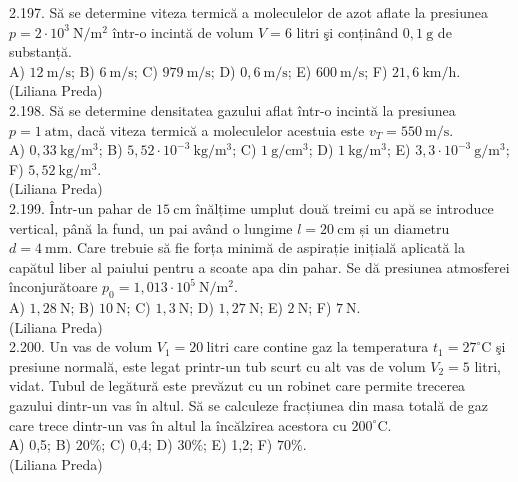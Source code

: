 \documentclass[10pt]{article}
\begin{document}
2.197. Să se determine viteza termică a moleculelor de azot aflate la presiunea $p=2 \cdot 10^{3} \mathrm{~N} / \mathrm{m}^{2}$ într-o incintă de volum $V=6$ litri şi conținând $0,1 \mathrm{~g}$ de substanță.\\ A) $12 \mathrm{~m} / \mathrm{s}$; B) $6 \mathrm{~m} / \mathrm{s}$; C) $979 \mathrm{~m} / \mathrm{s}$; D) $0,6 \mathrm{~m} / \mathrm{s}$; E) $600 \mathrm{~m} / \mathrm{s}$; F) $21,6 \mathrm{~km} / \mathrm{h}$.\\ (Liliana Preda)\\

2.198. Să se determine densitatea gazului aflat într-o incintă la presiunea $p=1 \mathrm{~atm}$, dacă viteza termică a moleculelor acestuia este $v_{T}=550 \mathrm{~m} / \mathrm{s}$.\\ A) $0,33 \mathrm{~kg} / \mathrm{m}^{3}$; B) $5,52 \cdot 10^{-3} \mathrm{~kg} / \mathrm{m}^{3}$; C) $1 \mathrm{~g} / \mathrm{cm}^{3}$; D) $1 \mathrm{~kg} / \mathrm{m}^{3}$; E) $3,3 \cdot 10^{-3} \mathrm{~g} / \mathrm{m}^{3}$; F) $5,52 \mathrm{~kg} / \mathrm{m}^{3}$.\\ (Liliana Preda)\\

2.199. Într-un pahar de $15 \mathrm{~cm}$ înălțime umplut două treimi cu apă se introduce vertical, până la fund, un pai având o lungime $l=20 \mathrm{~cm}$ și un diametru $d=4 \mathrm{~mm}$. Care trebuie să fie forța minimă de aspirație inițială aplicată la capătul liber al paiului pentru a scoate apa din pahar. Se dă presiunea atmosferei înconjurătoare $p_{0}=1,013 \cdot 10^{5} \mathrm{~N} / \mathrm{m}^{2}$.\\ A) $1,28 \mathrm{~N}$; B) $10 \mathrm{~N}$; C) $1,3 \mathrm{~N}$; D) $1,27 \mathrm{~N}$; E) $2 \mathrm{~N}$; F) $7 \mathrm{~N}$.\\ (Liliana Preda)\\

2.200. Un vas de volum $V_{1}=20 \mathrm{~litri}$ care contine gaz la temperatura $t_{1}=27^{\circ} \mathrm{C}$ şi presiune normală, este legat printr-un tub scurt cu alt vas de volum $V_{2}=5$ litri, vidat. Tubul de legătură este prevăzut cu un robinet care permite trecerea gazului dintr-un vas în altul. Să se calculeze fracțiunea din masa totală de gaz care trece dintr-un vas în altul la încălzirea acestora cu $200^{\circ} \mathrm{C}$.\\ А) 0,5; B) $20 \%$; C) 0,4; D) $30 \%$; E) 1,2; F) $70 \%$.\\ (Liliana Preda)\\
\end{document}
